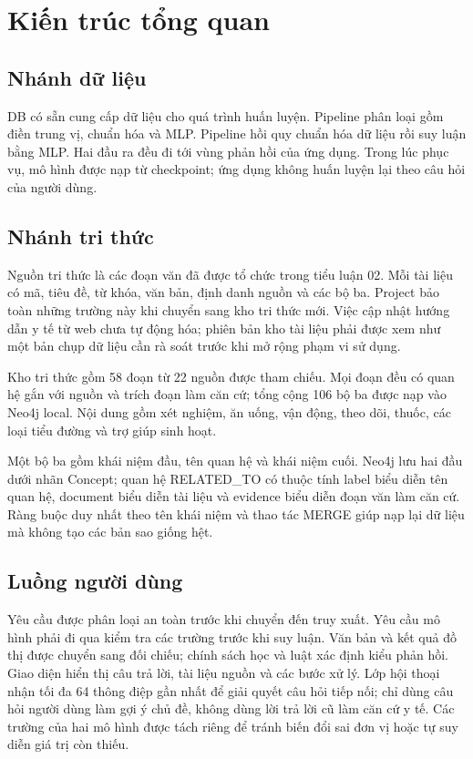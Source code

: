 \chapter{Kiến trúc tổng quan}
\section{Nhánh dữ liệu}
DB có sẵn cung cấp dữ liệu cho quá trình huấn luyện. Pipeline phân loại gồm điền trung vị, chuẩn hóa và MLP. Pipeline hồi quy chuẩn hóa dữ liệu rồi suy luận bằng MLP. Hai đầu ra đều đi tới vùng phản hồi của ứng dụng. Trong lúc phục vụ, mô hình được nạp từ checkpoint; ứng dụng không huấn luyện lại theo câu hỏi của người dùng.
\section{Nhánh tri thức}
Nguồn tri thức là các đoạn văn đã được tổ chức trong tiểu luận 02. Mỗi tài liệu có mã, tiêu đề, từ khóa, văn bản, định danh nguồn và các bộ ba. Project bảo toàn những trường này khi chuyển sang kho tri thức mới. Việc cập nhật hướng dẫn y tế từ web chưa tự động hóa; phiên bản kho tài liệu phải được xem như một bản chụp dữ liệu cần rà soát trước khi mở rộng phạm vi sử dụng.

Kho tri thức gồm 58 đoạn từ 22 nguồn được tham chiếu. Mọi đoạn đều có quan hệ gắn với nguồn và trích đoạn làm căn cứ; tổng cộng 106 bộ ba được nạp vào Neo4j local. Nội dung gồm xét nghiệm, ăn uống, vận động, theo dõi, thuốc, các loại tiểu đường và trợ giúp sinh hoạt.

Một bộ ba gồm khái niệm đầu, tên quan hệ và khái niệm cuối. Neo4j lưu hai đầu dưới nhãn Concept; quan hệ RELATED\_TO có thuộc tính label biểu diễn tên quan hệ, document biểu diễn tài liệu và evidence biểu diễn đoạn văn làm căn cứ. Ràng buộc duy nhất theo tên khái niệm và thao tác MERGE giúp nạp lại dữ liệu mà không tạo các bản sao giống hệt.
\section{Luồng người dùng}
Yêu cầu được phân loại an toàn trước khi chuyển đến truy xuất. Yêu cầu mô hình phải đi qua kiểm tra các trường trước khi suy luận. Văn bản và kết quả đồ thị được chuyển sang đối chiếu; chính sách học và luật xác định kiểu phản hồi. Giao diện hiển thị câu trả lời, tài liệu nguồn và các bước xử lý. Lớp hội thoại nhận tối đa 64 thông điệp gần nhất để giải quyết câu hỏi tiếp nối; chỉ dùng câu hỏi người dùng làm gợi ý chủ đề, không dùng lời trả lời cũ làm căn cứ y tế. Các trường của hai mô hình được tách riêng để tránh biến đổi sai đơn vị hoặc tự suy diễn giá trị còn thiếu.

